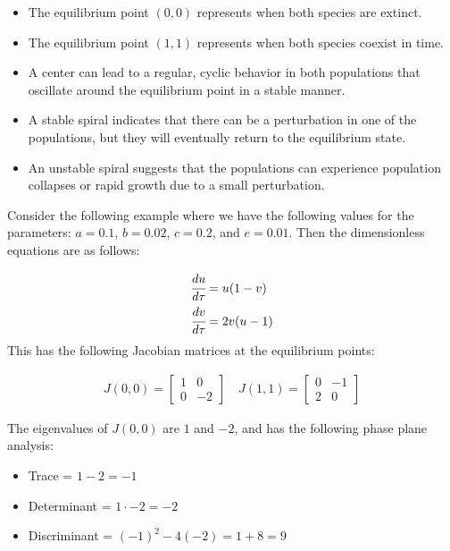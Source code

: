 \documentclass[11pt, letterpaper]{article}
\begin{document}
\begin{itemize}
    \item The equilibrium point $(0, 0)$ represents when both species are
          extinct.
    \item The equilibrium point $(1, 1)$ represents when both species coexist
          in time.
    \item A center can lead to a regular, cyclic behavior in both populations
          that oscillate around the equilibrium point in a stable manner.
    \item A stable spiral indicates that there can be a perturbation in one of
          the populations, but they will eventually return to the equilibrium state.
    \item An unstable spiral suggests that the populations can experience
          population collapses or rapid growth due to a small perturbation.
\end{itemize}

Consider the following example where we have the following values for the
parameters: $a = 0.1$, $b = 0.02$, $c = 0.2$, and $e = 0.01$. Then the dimensionless
equations are as follows:

    \begin{align*}
        \cfrac{du}{d\tau} & = u(1 - v) \\
        \cfrac{dv}{d\tau} & = 2v(u-1)
    \end{align*}
    This has the following Jacobian matrices at the equilibrium points:

    \begin{align*}
        J(0, 0) = \begin{bmatrix}
                      1 & 0  \\
                      0 & -2
                  \end{bmatrix}
        \quad
        J(1, 1) = \begin{bmatrix}
                      0 & -1 \\
                      2 & 0
                  \end{bmatrix}
    \end{align*}

The eigenvalues of $J(0, 0)$ are $1$ and $-2$, and has the following phase plane analysis:
\begin{itemize}
    \item Trace = $1 - 2 = -1$
    \item Determinant = $1 \cdot -2 = -2$
    \item Discriminant = $(-1)^2 - 4(-2) = 1 + 8 = 9$
\end{itemize}
\end{document}
